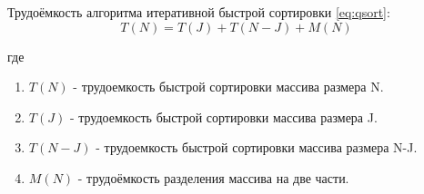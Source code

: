 Трудоёмкость алгоритма итеративной быстрой сортировки \eqref{eq:qsort}:
\begin{equation}
    \label{eq:qsort}
    T(N) = T(J) + T(N-J) + M(N)
\end{equation}

где

\begin{enumerate}
    \item $T(N)$ - трудоемкость быстрой сортировки массива размера N.
    \item $T(J)$ - трудоемкость быстрой сортировки массива размера J.
    \item $T(N-J)$ - трудоемкость быстрой сортировки массива размера N-J.
    \item $M(N)$ - трудоёмкость разделения массива на две части.
\end{enumerate}


